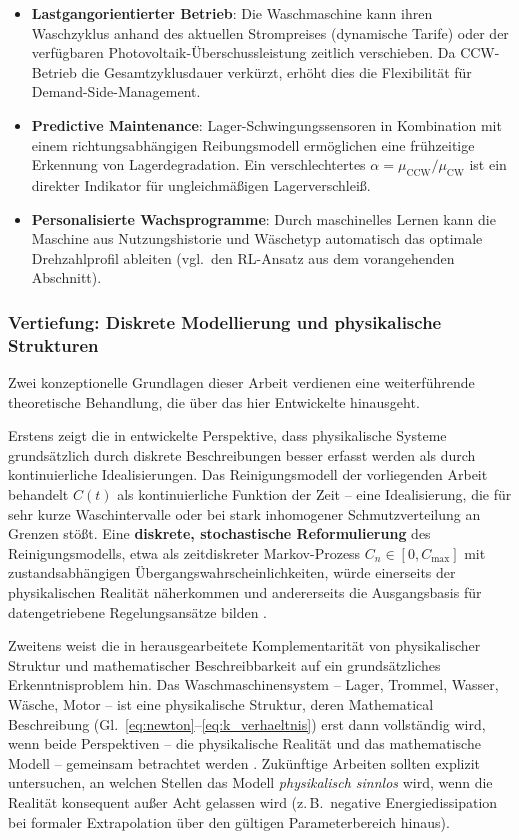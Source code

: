 ﻿\documentclass[12pt,a4paper]{article}
\theoremstyle{remark}
\newcommand{\CCW}{\mathrm{CCW}}
\newcommand{\CW}{\mathrm{CW}}
\begin{document}
	\begin{itemize}
		\item \textbf{Lastgangorientierter Betrieb}: Die Waschmaschine kann ihren
		Waschzyklus anhand des aktuellen Strompreises (dynamische Tarife) oder der
		verfügbaren Photovol\-taik-Überschussleistung zeitlich verschieben. Da CCW-Betrieb
		die Gesamtzyklusdauer verkürzt, erhöht dies die Flexibilität für Demand-Side-Management.
		\item \textbf{Predictive Maintenance}: Lager-Schwingungssensoren in Kombination
		mit einem richtungsabhängigen Reibungsmodell ermöglichen eine frühzeitige Erkennung
		von Lagerdegradation. Ein verschlechtertes $\alpha = \mu_{\CCW}/\mu_{\CW}$ ist ein
		direkter Indikator für ungleichmäßigen Lagerverschleiß.
		\item \textbf{Personalisierte Wachsprogramme}: Durch maschinelles Lernen kann die
		Maschine aus Nutzungshistorie und Wäschetyp automatisch das optimale Drehzahlprofil
		ableiten (vgl.\ den RL-Ansatz aus dem vorangehenden Abschnitt).
	\end{itemize}
	
	\subsubsection{Vertiefung: Diskrete Modellierung und physikalische Strukturen}
	
	Zwei konzeptionelle Grundlagen dieser Arbeit verdienen eine weiterführende theoretische
	Behandlung, die über das hier Entwickelte hinausgeht.
	
	Erstens zeigt die in \cite{epp2026digi} entwickelte Perspektive, dass physikalische
	Systeme grundsätzlich durch diskrete Beschreibungen besser erfasst werden als durch
	kontinuierliche Idealisierungen. Das Reinigungsmodell der vorliegenden Arbeit behandelt
	$C(t)$ als kontinuierliche Funktion der Zeit -- eine Idealisierung, die für sehr kurze
	Waschintervalle oder bei stark inhomogener Schmutzverteilung an Grenzen stößt.
	Eine \textbf{diskrete, stochastische Reformulierung} des Reinigungsmodells, etwa als
	zeitdiskreter Markov-Prozess $C_n \in [0, C_{\max}]$ mit zustandsabhängigen
	Übergangswahrscheinlichkeiten, würde einerseits der physikalischen Realität näherkommen
	und andererseits die Ausgangsbasis für datengetriebene Regelungsansätze bilden
	\cite{epp2026digi}.
	
	Zweitens weist die in \cite{epp2026physd} herausgearbeitete Komplementarität von
	physikalischer Struktur und mathematischer Beschreibbarkeit auf ein grundsätzliches
	Erkenntnisproblem hin. Das Waschmaschinensystem -- Lager, Trommel, Wasser, Wäsche,
	Motor -- ist eine physikalische Struktur, deren Mathematical Beschreibung (Gl.\
	\eqref{eq:newton}--\eqref{eq:k_verhaeltnis}) erst dann vollständig wird, wenn beide
	Perspektiven -- die physikalische Realität und das mathematische Modell -- gemeinsam
	betrachtet werden \cite{epp2026physd}. Zukünftige Arbeiten sollten explizit untersuchen,
	an welchen Stellen das Modell \emph{physikalisch sinnlos} wird, wenn die Realität
	konsequent außer Acht gelassen wird (z.\,B.\ negative Energiedissipation bei formaler
	Extrapolation über den gültigen Parameterbereich hinaus).
	
\end{document}
